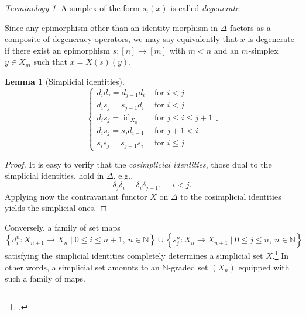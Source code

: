 \documentclass[10pt,letterpaper,cm]{nupset}
\theoremstyle{definition}
\theoremstyle{theorem}
\newtheorem{lemma}[definition]{Lemma}
\theoremstyle{remark}
\newtheorem*{term}{Terminology}
\newcommand{\0}{\mathbf{0}}
\newcommand{\1}{\mathbf{1}}
\newcommand{\2}{\mathbf{2}}
\newcommand{\N}{\mathbb N}
\DeclareMathOperator{\idd}{id}
\begin{document}
\begin{term}
A simplex of the form $s_i(x)$ is called \textit{degenerate}. 
\end{term}

Since any epimorphism other than an identity morphism in $\varDelta$ factors as a composite of degeneracy operators, we may say equivalently that $x$ is degenerate if there exist an epimorphism $s: \left[n\right] \to \left[m\right]$ with $m<n$ and an $m$-simplex $y\in X_m$ such that $x= X(s)(y)$.

\begin{lemma}[Simplicial identities]\label{Simpid}
\[
\left\{\begin{array}{ll}{d_{i} d_{j}=d_{j-1} d_{i}} & {\text { for } i<j} \\ {d_{i} s_{j}=s_{j-1} d_{i}} & {\text { for } i<j} \\ {d_{i} s_{j}= \idd_{X_n}} & {\text { for } j \leq i \leq j+1} \\ {d_{i} s_{j}=s_{j} d_{i-1}} & {\text { for } j+1<i} \\ {s_{i} s_{j}=s_{j+1} s_{i}} & {\text { for } i \leq j}\end{array}\right..
\]
\end{lemma}
\begin{proof}
It is easy to verify that the \textit{cosimplicial identities}, those dual to the simplicial identities, hold in $\varDelta$, e.g., $$\delta_j\delta_i =\delta_i\delta_{j-1}, \ \quad i<j.$$ Applying now the  contravariant functor $X$ on $\varDelta$ to the cosimplicial identities yields the simplicial ones.
\end{proof}

Conversely, a family of set maps $$\left\{ d_i^n : X_{n+1} \to X_n \mid 0 \leq i \leq n+1, \ n \in \N \right\} \cup \left\{s_j^n : X_n \to X_{n+1} \mid 0 \leq j \leq n, \ n \in \N\right\}$$ satisfying the simplicial identities completely determines a simplicial set $X$.\footnote{\autocite[Lemma 6.2.8]{Rognes}.} In other words, a simplicial set amounts to an $\N$-graded set $\left(X_n\right)$ equipped with such a family of maps.
\end{document}
